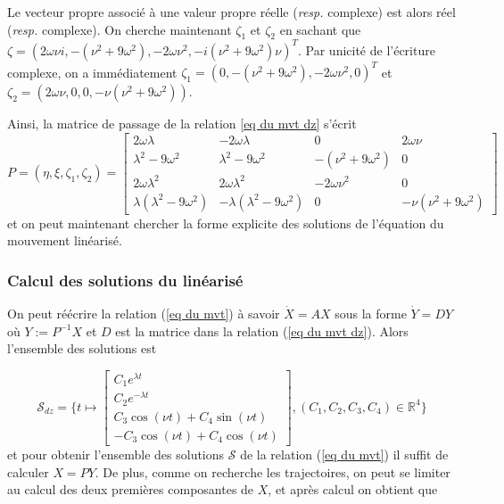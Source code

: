 \documentclass[12pt]{article}
\begin{document}
	Le vecteur propre associé à une valeur propre réelle (\textit{resp.} complexe) est alors réel (\textit{resp.} complexe). On cherche maintenant $\zeta_1$ et $\zeta_2$ en sachant que $\zeta = (2\omega \nu i, -(\nu^2+9\omega^2), -2\omega \nu^2,-i(\nu^2+9\omega^2)\nu)^T$. Par unicité de l'écriture complexe, on a immédiatement $\zeta_1 = (0, -(\nu^2+9\omega^2), -2\omega\nu^2, 0)^T$ et $\zeta_2 = (2\omega\nu,0,0,-\nu(\nu^2+9\omega^2))$.
	
	Ainsi, la matrice de passage de la relation \ref{eq du mvt dz} s'écrit
	\begin{equation}
		P = (\eta, \xi, \zeta_1, \zeta_2) =
		\begin{bmatrix}
			2\omega \lambda & -2\omega\lambda & 0 & 2\omega\nu
			\\
			\lambda^2 - 9\omega^2 & \lambda^2 - 9\omega^2 & -(\nu^2+9\omega^2) & 0
			\\
			2\omega\lambda^2 & 2\omega\lambda^2 & -2\omega\nu^2 & 0
			\\
			\lambda(\lambda^2 - 9\omega^2) & -\lambda(\lambda^2 - 9\omega^2) & 0 & -\nu(\nu^2+9\omega^2)
		\end{bmatrix}
	\end{equation}
	et on peut maintenant chercher la forme explicite des solutions de l'équation du mouvement linéarisé.
	
	\subsubsection{Calcul des solutions du linéarisé}
	On peut réécrire la relation (\ref{eq du mvt}) à savoir $\dot{X} = AX$ sous la forme $\dot{Y} = DY$ où $Y := P^{-1}X$ et $D$ est la matrice dans la relation (\ref{eq du mvt dz}). Alors l'ensemble des solutions est 
	
	\begin{equation}
		\mathcal{S}_{dz} = \{
		t \mapsto 
			\begin{bmatrix}
				C_1e^{\lambda t} \\ C_2e^{- \lambda t} \\ C_3 \cos(\nu t) + C_4 \sin(\nu t) \\ -C_3\cos(\nu t) + C_4\cos(\nu t)
			\end{bmatrix}
		, (C_1, C_2, C_3, C_4) \in \mathbb{R}^4
		\}
	\end{equation} 
	et pour obtenir l'ensemble des solutions $\mathcal{S}$ de la relation (\ref{eq du mvt}) il suffit de calculer $X = PY$. De plus, comme on recherche les trajectoires, on peut se limiter au calcul des deux premières composantes de $X$, et après calcul on obtient que
	
\end{document}
